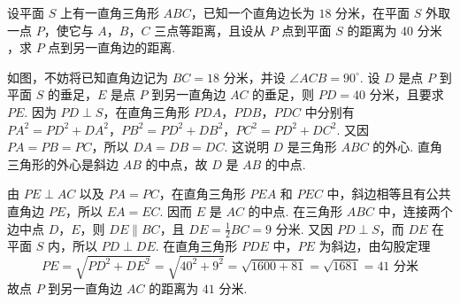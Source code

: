 \begin{problem}
设平面 \(S\) 上有一直角三角形 \(ABC\)，已知一个直角边长为 \(18\text{ 分米}\)，在平面 \(S\) 外取一点 \(P\)，使它与 \(A\)，\(B\)，\(C\) 三点等距离，且设从 \(P\) 点到平面 \(S\) 的距离为 \(40\text{ 分米}\)，求 \(P\) 点到另一直角边的距离.
\end{problem}

\begin{solution}
如图，不妨将已知直角边记为 \(BC=18\text{ 分米}\)，并设 \(\angle ACB=90^{\circ}\). 设 \(D\) 是点 \(P\) 到平面 \(S\) 的垂足，\(E\) 是点 \(P\) 到另一直角边 \(AC\) 的垂足，则 \(PD=40\text{ 分米}\)，且要求 \(PE\).
因为 \(PD\perp S\)，在直角三角形 \(PDA\)，\(PDB\)，\(PDC\) 中分别有 \(PA^{2}=PD^{2}+DA^{2}\)，\(PB^{2}=PD^{2}+DB^{2}\)，\(PC^{2}=PD^{2}+DC^{2}\).
又因 \(PA=PB=PC\)，所以 \(DA=DB=DC\). 这说明 \(D\) 是三角形 \(ABC\) 的外心. 直角三角形的外心是斜边 \(AB\) 的中点，故 \(D\) 是 \(AB\) 的中点.

由 \(PE\perp AC\) 以及 \(PA=PC\)，在直角三角形 \(PEA\) 和 \(PEC\) 中，斜边相等且有公共直角边 \(PE\)，所以 \(EA=EC\). 因而 \(E\) 是 \(AC\) 的中点. 在三角形 \(ABC\) 中，连接两个边中点 \(D\)，\(E\)，则
\(DE\parallel BC\)，且 \(DE=\frac{1}{2}BC=9\text{ 分米}\).
又因 \(PD\perp S\)，而 \(DE\) 在平面 \(S\) 内，所以 \(PD\perp DE\). 在直角三角形 \(PDE\) 中，\(PE\) 为斜边，由勾股定理
\[
PE=\sqrt{PD^{2}+DE^{2}}=\sqrt{40^{2}+9^{2}}=\sqrt{1600+81}=\sqrt{1681}=41\text{ 分米}
\]
故点 \(P\) 到另一直角边 \(AC\) 的距离为 \(41\text{ 分米}\).
\end{solution}
